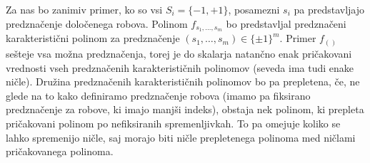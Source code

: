 Za nas bo zanimiv primer, ko so vsi \(S_i=\{-1, +1\}\), posamezni \(s_i\) pa predstavljajo predznačenje določenega robova. Polinom \(f_{s_1, \ldots, s_m}\) bo predstavljal predznačeni karakteristični polinom za predznačenje \((s_1,\ldots, s_m) \in \{\pm 1\}^m\). Primer \(f_{()}\) sešteje vsa možna predznačenja, torej je do skalarja natančno enak pričakovani vrednosti vseh predznačenih karakterističnih polinomov (seveda ima tudi enake ničle). Družina predznačenih karakterističnih polinomov bo pa prepletena, če, ne glede na to kako definiramo predznačenje robova (imamo pa fiksirano predznačenje za robove, ki imajo manjši indeks), obstaja nek polinom, ki prepleta pričakovani polinom po nefiksiranih spremenljivkah. To pa omejuje koliko se lahko spremenijo ničle, saj morajo biti ničle prepletenega polinoma med ničlami pričakovanega polinoma.

